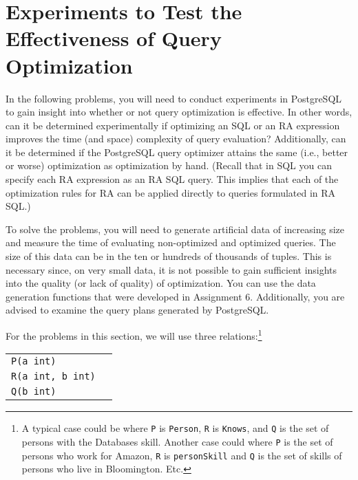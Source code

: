 \documentclass[10pt]{article}
\begin{document}
\newpage
\section{Experiments to Test the Effectiveness of Query Optimization}
In the following problems, you will need to conduct experiments in PostgreSQL to gain insight into
whether or not query optimization is effective.  
In other words, can it be determined experimentally 
if optimizing an SQL or an RA expression improves the time (and space) complexity of query evaluation?
Additionally, can it be determined if the PostgreSQL query optimizer attains the same (i.e., better or worse)
optimization as optimization by hand.
(Recall that in SQL you can specify each RA expression as an RA SQL query.   This implies that each of the
optimization rules for RA can be applied directly to queries formulated in RA SQL.)

To solve the problems, you will need to generate artificial data
of increasing size and measure the time of evaluating non-optimized and
optimized queries.    The size of this data can be in the ten or hundreds of thousands of tuples.
This is necessary since, on very small data, it is not possible to gain
sufficient insights into the quality (or lack of quality) of optimization.
You can use the data generation functions that were developed in Assignment 6.
Additionally, you are advised to examine the query plans generated by PostgreSQL.

For the problems in this section, we will use three relations:\footnote{A typical case could be where {\tt P} is {\tt Person},
{\tt R} is {\tt Knows}, and {\tt Q} is the set of persons with the Databases skill.   Another case could where {\tt P} is the set of persons who
work for Amazon, {\tt R} is {\tt personSkill} and {\tt Q} is the set of skills of persons who live in Bloomington. Etc.}
\begin{center}
\begin{tabular}{ll}
{\tt P(a int)} \\
{\tt R(a int, b int)} \\
{\tt Q(b int)}
\end{tabular}
\end{center}
\end{document}
